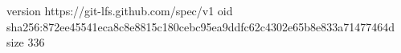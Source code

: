 version https://git-lfs.github.com/spec/v1
oid sha256:872ee45541eca8c8e8815c180cebc95ea9ddfc62c4302e65b8e833a71477464d
size 336
